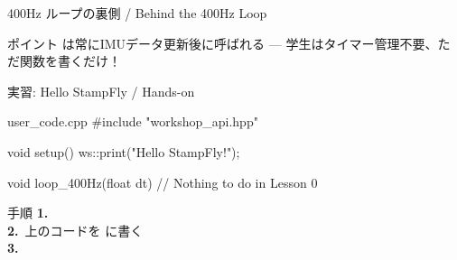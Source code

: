 \begin{frame}{400Hz ループの裏側 / Behind the 400Hz Loop}
  \begin{center}
    \vspace{-2mm}
    \resizebox{0.85\textwidth}{!}{}
  \end{center}

  \vspace{-0.5em}

  \begin{exampleblock}{ポイント}
     は常にIMUデータ更新後に呼ばれる
    --- 学生はタイマー管理不要、ただ関数を書くだけ！
  \end{exampleblock}
\end{frame}

\begin{frame}[fragile]{実習: Hello StampFly / Hands-on}
  \begin{sflisting}{user\_code.cpp}
#include "workshop_api.hpp"

void setup()
{
    ws::print("Hello StampFly!");
}

void loop_400Hz(float dt)
{
    // Nothing to do in Lesson 0
}
  \end{sflisting}
  \vspace{-0.8em}
  \begin{exampleblock}{手順}\small
    \textbf{1.}~\\
    \textbf{2.}~上のコードを  に書く\\
    \textbf{3.}~
  \end{exampleblock}
\end{frame}

